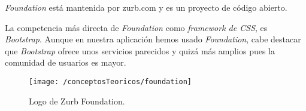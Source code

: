 \textit{Foundation} está mantenida por zurb.com y es un proyecto de código abierto.

La competencia más directa de \textit{Foundation} como \textit{framework de CSS}, es \textit{Bootstrap}. Aunque en nuestra aplicación hemos usado \textit{Foundation}, cabe destacar que \textit{Bootstrap} ofrece unos servicios parecidos y quizá más amplios pues la comunidad de usuarios es mayor.

\begin{figure}[ht]
	\centering
	\texttt{[image: /conceptosTeoricos/foundation]}
	\caption{Logo de Zurb Foundation.}
	\label{fig:foundation}
\end{figure}

